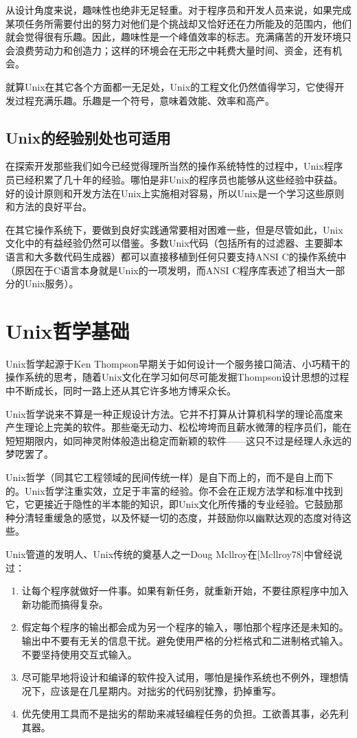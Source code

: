 \documentclass[11pt,oneside]{book}
\begin{document}
\begin{common-format}
从设计角度来说，趣味性也绝非无足轻重。对于程序员和开发人员来说，如果完成某项任务所需要付出的努力对他们是个挑战却又恰好还在力所能及的范围内，他们就会觉得很有乐趣。因此，趣味性是一个峰值效率的标志。充满痛苦的开发环境只会浪费劳动力和创造力；这样的环境会在无形之中耗费大量时间、资金，还有机会。

就算Unix在其它各个方面都一无足处，Unix的工程文化仍然值得学习，它使得开发过程充满乐趣。乐趣是一个符号，意味着效能、效率和高产。

\subsection{Unix的经验别处也可适用}
在探索开发那些我们如今已经觉得理所当然的操作系统特性的过程中，Unix程序员已经积累了几十年的经验。哪怕是非Unix的程序员也能够从这些经验中获益。好的设计原则和开发方法在Unix上实施相对容易，所以Unix是一个学习这些原则和方法的良好平台。

在其它操作系统下，要做到良好实践通常要相对困难一些，但是尽管如此，Unix文化中的有益经验仍然可以借鉴。多数Unix代码（包括所有的过滤器、主要脚本语言和大多数代码生成器）都可以直接移植到任何只要支持ANSI C的操作系统中（原因在于C语言本身就是Unix的一项发明，而ANSI C程序库表述了相当大一部分的Unix服务）。


\section{Unix哲学基础}
Unix哲学起源于Ken Thompson早期关于如何设计一个服务接口简洁、小巧精干的操作系统的思考，随着Unix文化在学习如何尽可能发掘Thompson设计思想的过程中不断成长，同时一路上还从其它许多地方博采众长。

Unix哲学说来不算是一种正规设计方法。它并不打算从计算机科学的理论高度来产生理论上完美的软件。那些毫无动力、松松垮垮而且薪水微薄的程序员们，能在短短期限内，如同神灵附体般造出稳定而新颖的软件——这只不过是经理人永远的梦呓罢了。
    
Unix哲学（同其它工程领域的民间传统一样）是自下而上的，而不是自上而下的。Unix哲学注重实效，立足于丰富的经验。你不会在正规方法学和标准中找到它，它更接近于隐性的半本能的知识，即Unix文化所传播的专业经验。它鼓励那种分清轻重缓急的感觉，以及怀疑一切的态度，并鼓励你以幽默达观的态度对待这些。
   
Unix管道的发明人、Unix传统的奠基人之一Doug Mcllroy在[Mcllroy78]中曾经说过：
\begin{enumerate}
\renewcommand{\labelenumi}{（\roman{enumi}）}
\item 让每个程序就做好一件事。如果有新任务，就重新开始，不要往原程序中加入新功能而搞得复杂。
\item 假定每个程序的输出都会成为另一个程序的输入，哪怕那个程序还是未知的。输出中不要有无关的信息干扰。避免使用严格的分栏格式和二进制格式输入。不要坚持使用交互式输入。
\item 尽可能早地将设计和编译的软件投入试用，哪怕是操作系统也不例外，理想情况下，应该是在几星期内。对拙劣的代码别犹豫，扔掉重写。
\item 优先使用工具而不是拙劣的帮助来减轻编程任务的负担。工欲善其事，必先利其器。
\end{enumerate}


\end{common-format}
\end{document}

